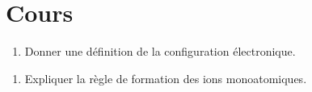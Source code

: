 \documentclass[a4paper,12pt,fleqn]{article}%
\begin{document}
\maketitle
\section{Cours}
\begin{enumerate}
    \item Donner une définition de la configuration électronique.
\end{enumerate}
\noindent\fbox{
    \begin{minipage}{\textwidth}
        \vspace{5em}
        \hspace{\linewidth}
    \end{minipage}
}


\begin{enumerate}[resume]
    \item Expliquer la règle de formation des ions monoatomiques.
\end{enumerate}

\noindent\fbox{
    \begin{minipage}{\textwidth}
        \vspace{8em}
        \hspace{\linewidth}
    \end{minipage}
}
\end{document}
